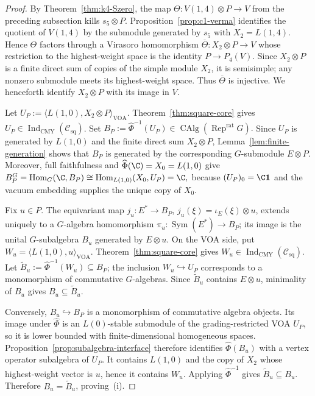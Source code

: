 \documentclass[12pt,leqno]{amsart}
\numberwithin{equation}{section} \newtheorem{thm}{Theorem}[section] \newtheorem{lem}[thm]{Lemma} \newtheorem{ex}[thm]{Example} \newtheorem{prop}[thm]{Proposition} \newtheorem{cor}[thm]{Corollary} \newtheorem{defi}[thm]{Definition} \newtheorem{rmk}[thm]{Remark} \newtheorem{notation}[thm]{Notation}
\newcommand{\one}{\mathbf{1}}
\newcommand{\Rep}{\operatorname{Rep}}
\newcommand{\Sym}{\operatorname{Sym}}
\newcommand{\Hom}{\operatorname{Hom}}
\newcommand{\Csq}{\mathcal C_{\mathrm{sq}}}
\newcommand{\CAlg}{\operatorname{CAlg}}
\newcommand{\IndCMY}{\operatorname{Ind}_{\mathrm{CMY}}}
\begin{document}
\begin{proof}
By Theorem~\ref{thm:k4-Szero}, the map \(\Theta:V(1,4)\otimes P\to V\) from the preceding subsection kills $s_5\otimes P$. Proposition~\ref{prop:c1-verma} identifies the quotient of $V(1,4)$ by the submodule generated by $s_5$ with $X_2=L(1,4)$. Hence $\Theta$ factors through a Virasoro homomorphism \(\overline\Theta:X_2\otimes P\longrightarrow V\) whose restriction to the highest-weight space is the identity $P\to P_4(V)$. Since $X_2\otimes P$ is a finite direct sum of copies of the simple module $X_2$, it is semisimple; any nonzero submodule meets its highest-weight space. Thus $\overline\Theta$ is injective. We henceforth identify $X_2\otimes P$ with its image in $V$.

Let \(U_P:=\langle L(1,0),X_2\otimes P\rangle_{\mathrm{VOA}}.\) Theorem~\ref{thm:square-core} gives $U_P\in\IndCMY(\Csq)$. Set \(B_P:=\widehat\Phi^{-1}(U_P)\in\CAlg(\Rep^{\mathrm{rat}}G).\) Since $U_P$ is generated by $L(1,0)$ and the finite direct sum $X_2\otimes P$, Lemma~\ref{lem:finite-generation} shows that $B_P$ is generated by the corresponding $G$-submodule $E\otimes P$. Moreover, full faithfulness and $\widehat\Phi(\C)=X_0=L(1,0)$ give \(B_P^G=\Hom_G(\C,B_P) \cong \Hom_{L(1,0)}(X_0,U_P)=\C,\) because $(U_P)_0=\C\one$ and the vacuum embedding supplies the unique copy of $X_0$.

Fix $u\in P$. The equivariant map \(j_u:E^*\to B_P\), \(j_u(\xi)=\iota_E(\xi)\otimes u\), extends uniquely to a $G$-algebra homomorphism \(\pi_u:\Sym(E^*)\to B_P\); its image is the unital $G$-subalgebra $B_u$ generated by $E\otimes u$. On the VOA side, put \(W_u=\langle L(1,0),u\rangle_{\mathrm{VOA}}.\) Theorem~\ref{thm:square-core} gives $W_u\in\IndCMY(\Csq)$. Let \(\widetilde B_u:=\widehat\Phi^{-1}(W_u)\subseteq B_P\); the inclusion $W_u\hookrightarrow U_P$ corresponds to a monomorphism of commutative $G$-algebras. Since $\widetilde B_u$ contains $E\otimes u$, minimality of $B_u$ gives $B_u\subseteq\widetilde B_u$.

Conversely, $B_u\hookrightarrow B_P$ is a monomorphism of commutative algebra objects. Its image under $\widehat\Phi$ is an $L(0)$-stable submodule of the grading-restricted VOA $U_P$, so it is lower bounded with finite-dimensional homogeneous spaces. Proposition~\ref{prop:subalgebra-interface} therefore identifies $\widehat\Phi(B_u)$ with a vertex operator subalgebra of $U_P$. It contains $L(1,0)$ and the copy of $X_2$ whose highest-weight vector is $u$, hence it contains $W_u$. Applying $\widehat\Phi^{-1}$ gives $\widetilde B_u\subseteq B_u$. Therefore $B_u=\widetilde B_u$, proving~(i).


\end{proof}
\end{document}
